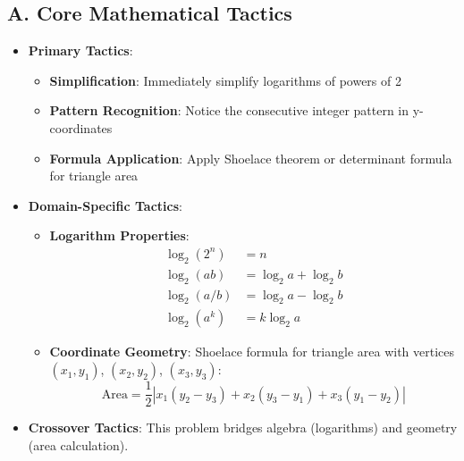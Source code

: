 \documentclass[12pt]{article}
\begin{document}
\begin{tacticalbox}
\subsection*{A. Core Mathematical Tactics}
\begin{itemize}[leftmargin=*]
    \item \textbf{Primary Tactics}: 
    \begin{itemize}
        \item \textbf{Simplification}: Immediately simplify logarithms of powers of 2
        \item \textbf{Pattern Recognition}: Notice the consecutive integer pattern in y-coordinates
        \item \textbf{Formula Application}: Apply Shoelace theorem or determinant formula for triangle area
    \end{itemize}
    
    \item \textbf{Domain-Specific Tactics}:
    \begin{itemize}
        \item \textbf{Logarithm Properties}:
        \begin{align*}
            \log_2(2^n) &= n \\
            \log_2(ab) &= \log_2 a + \log_2 b \\
            \log_2(a/b) &= \log_2 a - \log_2 b \\
            \log_2(a^k) &= k\log_2 a
        \end{align*}
        
        \item \textbf{Coordinate Geometry}: Shoelace formula for triangle area with vertices $(x_1,y_1)$, $(x_2,y_2)$, $(x_3,y_3)$:
        $$\text{Area} = \frac{1}{2}|x_1(y_2-y_3) + x_2(y_3-y_1) + x_3(y_1-y_2)|$$
    \end{itemize}
    
    \item \textbf{Crossover Tactics}: This problem bridges algebra (logarithms) and geometry (area calculation).
\end{itemize}
\end{tacticalbox}
\end{document}
